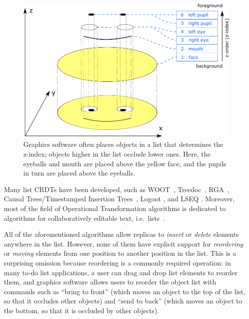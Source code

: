 \documentclass[sigplan,10pt]{acmart}
\begin{document}
\begin{figure}
  \centering
  \includegraphics{smiley.pdf}
  \caption{Graphics software often places objects in a list that determines the z-index; objects higher in the list occlude lower ones. %
    Here, the eyeballs and mouth are placed above the yellow face, and the pupils in turn are placed above the eyeballs.}
  \label{fig:smiley}
\end{figure}

Many list CRDTs have been developed, such as WOOT~\cite{Oster:2006wj}, Treedoc~\cite{Preguica:2009fz}, RGA~\cite{Roh:2011dw}, Causal Trees/Timestamped Insertion Trees~\cite{Grishchenko:2014eh,Attiya:2016kh}, Logoot \cite{Weiss:2009ht,Weiss:2010hx}, and LSEQ \cite{Nedelec:2013ky,Nedelec:2016eo}.
Moreover, most of the field of Operational Transformation algorithms is dedicated to algorithms for collaboratively editable text, i.e.\ lists~\cite{Ellis:1989ue,Nichols:1995fd,Ressel:1996wx,Sun:1998vf,Oster:2006tr}.

All of the aforementioned algorithms allow replicas to \emph{insert} or \emph{delete} elements anywhere in the list.
However, none of them have explicit support for \emph{reordering} or \emph{moving} elements from one position to another position in the list.
This is a surprising omission because reordering is a commonly required operation: in many to-do list applications, a user can drag and drop list elements to reorder them, and graphics software allows users to reorder the object list with commands such as ``bring to front'' (which moves an object to the top of the list, so that it occludes other objects) and ``send to back'' (which moves an object to the bottom, so that it is occluded by other objects).
\end{document}
